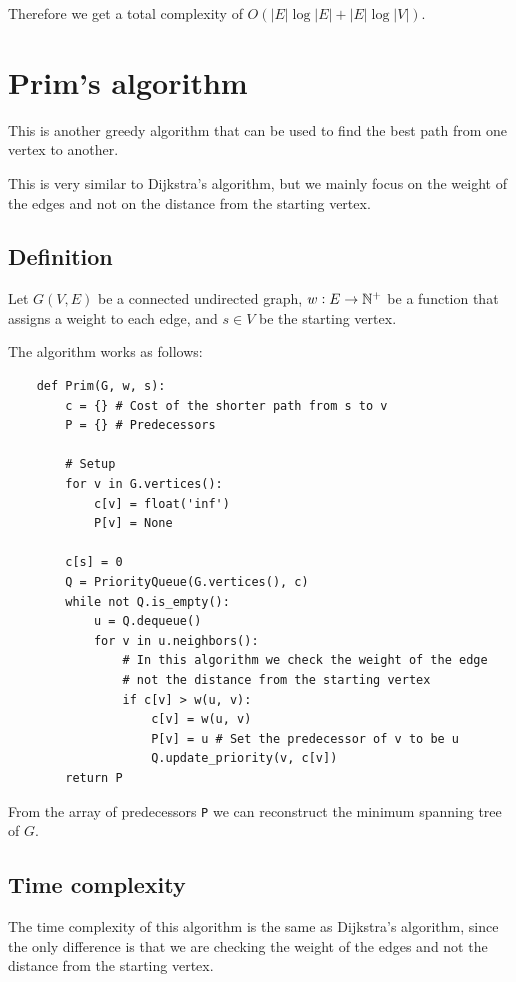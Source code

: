 \documentclass[12pt]{extarticle}
\begin{document}
Therefore we get a total complexity of $O(|E| \log |E| + |E| \log |V|)$.

\section{Prim's algorithm}

This is another greedy algorithm that can be used to find the best path from one vertex to another.

This is very similar to Dijkstra's algorithm, but we mainly focus on the weight of the edges and not on the distance from the starting vertex.

\subsection{Definition}

Let $G(V, E)$ be a connected undirected graph, $w: E \to \mathbb{N}^+$ be a function that assigns a weight to each edge, and $s \in V$ be the starting vertex.

The algorithm works as follows:

\begin{verbatim}
    def Prim(G, w, s):
        c = {} # Cost of the shorter path from s to v
        P = {} # Predecessors

        # Setup
        for v in G.vertices():
            c[v] = float('inf')
            P[v] = None
        
        c[s] = 0
        Q = PriorityQueue(G.vertices(), c)
        while not Q.is_empty():
            u = Q.dequeue()
            for v in u.neighbors():
                # In this algorithm we check the weight of the edge
                # not the distance from the starting vertex
                if c[v] > w(u, v):
                    c[v] = w(u, v)
                    P[v] = u # Set the predecessor of v to be u
                    Q.update_priority(v, c[v])
        return P
\end{verbatim}

From the array of predecessors \texttt{P} we can reconstruct the minimum spanning tree of $G$.


\subsection{Time complexity}

The time complexity of this algorithm is the same as Dijkstra's algorithm, since the only difference is that we are checking the weight of the edges and not the distance from the starting vertex.
\end{document}
